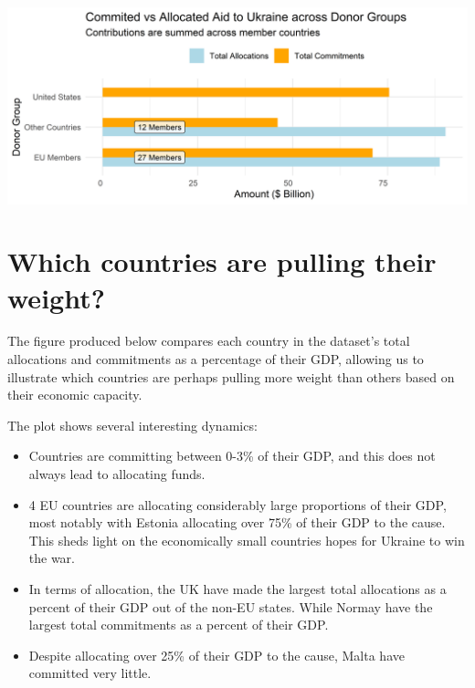 \documentclass[11pt,preprint, authoryear]{elsarticle}
\let\origfigure\figure
\let\endorigfigure\endfigure
\renewenvironment{figure}[1][2] {
    \expandafter\origfigure\expandafter[H]
} {
    \endorigfigure
}
\numberwithin{equation}{section}
\numberwithin{figure}{section}
\numberwithin{table}{section}
\begin{document}
\begin{figure}[H]

{\centering \includegraphics{Question_3_files/figure-latex/Figure1-1} 

}

\caption{EU Allocations \label{Figure1}}\label{fig:Figure1}
\end{figure}

\hypertarget{which-countries-are-pulling-their-weight}{%
\section{\texorpdfstring{Which countries are pulling their weight?
\label{vsGDP}}{Which countries are pulling their weight? }}\label{which-countries-are-pulling-their-weight}}

The figure produced below compares each country in the dataset's total
allocations and commitments as a percentage of their GDP, allowing us to
illustrate which countries are perhaps pulling more weight than others
based on their economic capacity.

The plot shows several interesting dynamics:

\begin{itemize}
\item
  Countries are committing between 0-3\% of their GDP, and this does not
  always lead to allocating funds.
\item
  4 EU countries are allocating considerably large proportions of their
  GDP, most notably with Estonia allocating over 75\% of their GDP to
  the cause. This sheds light on the economically small countries hopes
  for Ukraine to win the war.
\item
  In terms of allocation, the UK have made the largest total allocations
  as a percent of their GDP out of the non-EU states. While Normay have
  the largest total commitments as a percent of their GDP.
\item
  Despite allocating over 25\% of their GDP to the cause, Malta have
  committed very little.
\end{itemize}
\end{document}

